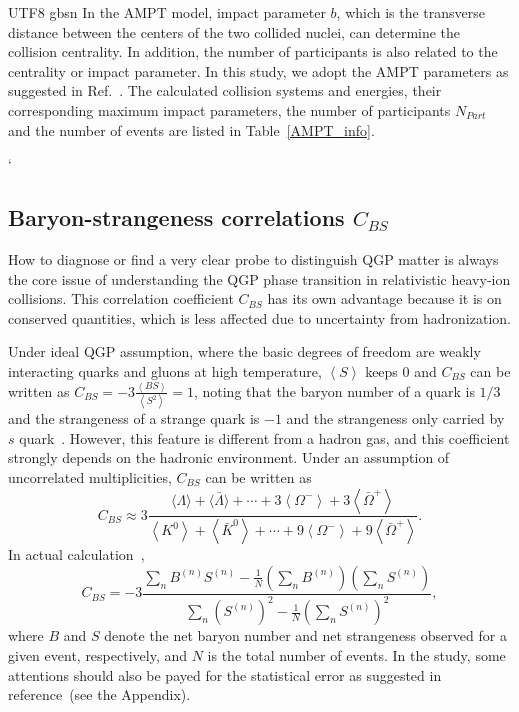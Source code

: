 \documentclass[twocolumn,showpacs,preprintnumbers,amsmath,amssymb]{revtex4-1}
\begin{document}
\begin{CJK*} {UTF8} {gbsn}
		In the AMPT model, impact parameter $b$, which is the transverse distance between the centers of the two collided nuclei, can determine the collision centrality. In addition, the number of participants is also related to the centrality or impact parameter. In this study, we adopt the AMPT parameters as  suggested in Ref.~\cite{Ye_2017}.  The calculated  collision systems and energies, their corresponding maximum impact parameters, the number of participants $N_{Part}$ and the number of events  are listed in Table~\ref{AMPT_info}.
		
		
		‘
	\subsection{Baryon-strangeness correlations $C_{BS}$}
	
	How to diagnose or find a very clear probe to distinguish QGP matter is always  the core issue of understanding the QGP phase transition in relativistic heavy-ion collisions.
	This correlation coefficient $C_{BS}$ has its own advantage because it is on  conserved quantities, which is less affected due to  uncertainty from hadronization.
	
	{} Under ideal QGP assumption, where the basic degrees of freedom are weakly interacting quarks and gluons at high temperature,  $\left\langle S \right\rangle$ keeps $0$ and $C_{BS}$ can be written as $C_{BS} = -3 \frac{\left\langle BS \right\rangle}{\left\langle S^{2}\right\rangle}=1$,
	noting that the baryon number of a quark is $1/3$ and the strangeness of a strange quark is $-1$ and the strangeness only carried by $s$ quark~\cite{Koch_origin}.
	However, this feature is different from a hadron gas, and this coefficient strongly depends on the hadronic environment.
	Under an assumption of uncorrelated multiplicities, $C_{BS}$ can be written as~\cite{Koch_origin}
\begin{equation}
C_{B S} \approx 3 \frac{\langle\Lambda\rangle+\langle\bar{\Lambda}\rangle+\cdots+3\left\langle\Omega^{-}\right\rangle+3\left\langle\bar{\Omega}^{+}\right\rangle}{\left\langle K^{0}\right\rangle+\left\langle\bar{K}^{0}\right\rangle+\cdots+9\left\langle\Omega^{-}\right\rangle+9\left\langle\bar{\Omega}^{+}\right\rangle}.
\end{equation}
	In actual calculation~\cite{Koch_origin},
\begin{equation}
C_{B S}=-3 \frac{\sum_{n} B^{(n)} S^{(n)}-\frac{1}{N}\left(\sum_{n} B^{(n)}\right)\left(\sum_{n} S^{(n)}\right)}{\sum_{n}\left(S^{(n)}\right)^{2}-\frac{1}{N}\left(\sum_{n} S^{(n)}\right)^{2}},
\end{equation}
where $B$ and $S$ denote the net baryon number and net strangeness observed for a given event, respectively, and 
$N$ is the total number of events. In the study, some attentions should also be payed for 
the statistical error as suggested in reference~\cite{Luo_UrQMD,Luo_2012}(see the Appendix).	
%

\end{CJK*}
\end{document}
